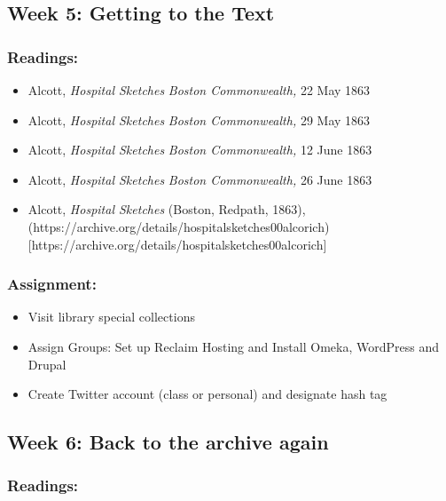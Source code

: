 \documentclass[]{article}
\begin{document}
\subsection{Week 5: Getting to the
Text}\label{week-5-getting-to-the-text}

\subsubsection{Readings:}\label{readings-3}

\begin{itemize}
\itemsep1pt\parskip0pt
\item
  Alcott, \emph{Hospital Sketches} \emph{Boston Commonwealth,} 22 May
  1863
\item
  Alcott, \emph{Hospital Sketches} \emph{Boston Commonwealth,} 29 May
  1863
\item
  Alcott, \emph{Hospital Sketches} \emph{Boston Commonwealth,} 12 June
  1863
\item
  Alcott, \emph{Hospital Sketches} \emph{Boston Commonwealth,} 26 June
  1863
\item
  Alcott, \emph{Hospital Sketches} (Boston, Redpath, 1863),
  (https://archive.org/details/hospitalsketches00alcorich){[}https://archive.org/details/hospitalsketches00alcorich{]}
\end{itemize}

\subsubsection{Assignment:}\label{assignment-3}

\begin{itemize}
\itemsep1pt\parskip0pt
\item
  Visit library special collections
\item
  Assign Groups: Set up Reclaim Hosting and Install Omeka, WordPress and
  Drupal
\item
  Create Twitter account (class or personal) and designate hash tag
\end{itemize}

\subsection{Week 6: Back to the archive
again}\label{week-6-back-to-the-archive-again}

\subsubsection{Readings:}\label{readings-4}
\end{document}
